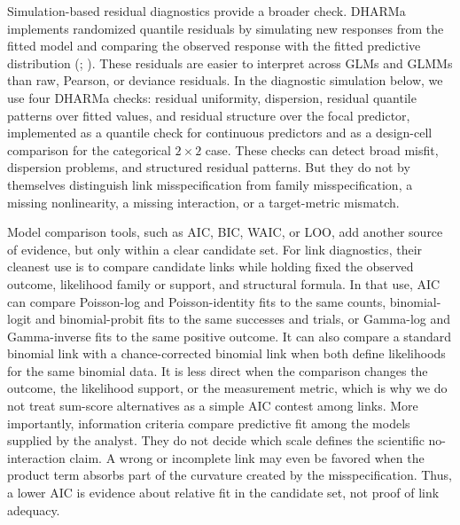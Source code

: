\documentclass[
  man,
  longtable,
  nolmodern,
  notxfonts,
  notimes,
  colorlinks=true,linkcolor=blue,citecolor=blue,urlcolor=blue]{apa7}
\begin{document}
Simulation-based residual diagnostics provide a broader check. DHARMa
implements randomized quantile residuals by simulating new responses
from the fitted model and comparing the observed response with the
fitted predictive distribution (; ). These residuals
are easier to interpret across GLMs and GLMMs than raw, Pearson, or
deviance residuals. In the diagnostic simulation below, we use four
DHARMa checks: residual uniformity, dispersion, residual quantile
patterns over fitted values, and residual structure over the focal
predictor, implemented as a quantile check for continuous predictors and
as a design-cell comparison for the categorical \(2 \times 2\) case.
These checks can detect broad misfit, dispersion problems, and
structured residual patterns. But they do not by themselves distinguish
link misspecification from family misspecification, a missing
nonlinearity, a missing interaction, or a target-metric mismatch.

Model comparison tools, such as AIC, BIC, WAIC, or LOO, add another
source of evidence, but only within a clear candidate set. For link
diagnostics, their cleanest use is to compare candidate links while
holding fixed the observed outcome, likelihood family or support, and
structural formula. In that use, AIC can compare Poisson-log and
Poisson-identity fits to the same counts, binomial-logit and
binomial-probit fits to the same successes and trials, or Gamma-log and
Gamma-inverse fits to the same positive outcome. It can also compare a
standard binomial link with a chance-corrected binomial link when both
define likelihoods for the same binomial data. It is less direct when
the comparison changes the outcome, the likelihood support, or the
measurement metric, which is why we do not treat sum-score alternatives
as a simple AIC contest among links. More importantly, information
criteria compare predictive fit among the models supplied by the
analyst. They do not decide which scale defines the scientific
no-interaction claim. A wrong or incomplete link may even be favored
when the product term absorbs part of the curvature created by the
misspecification. Thus, a lower AIC is evidence about relative fit in
the candidate set, not proof of link adequacy.
\end{document}
